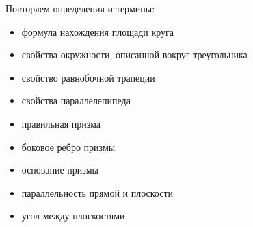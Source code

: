\documentclass[geometry,a5paper]{pum}
\date{24.03.20}
\begin{document}
Повторяем определения и термины:
\begin{itemize}
  \item формула нахождения площади круга
  \item свойства окружности, описанной вокруг треугольника
  \item свойство равнобочной трапеции
  \item свойства параллелепипеда
  \item правильная призма
  \item боковое ребро призмы
  \item основание призмы
  \item параллельность прямой и плоскости
  \item угол между плоскостями
\end{itemize}
\end{document}
